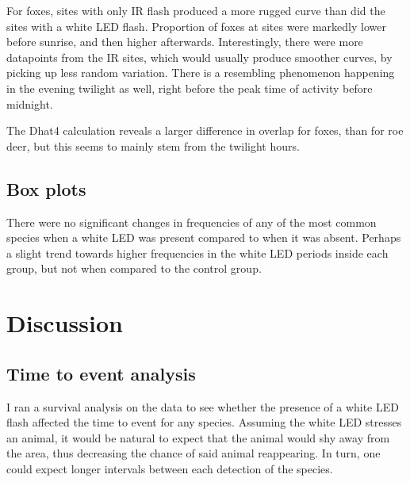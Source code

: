 For foxes, sites with only IR flash produced a more rugged curve than did the sites with a white LED flash.
Proportion of foxes at sites were markedly lower before sunrise, and then higher afterwards. 
Interestingly, there were more datapoints from the IR sites, which would usually produce smoother curves, by picking up less random variation. 
There is a resembling phenomenon happening in the evening twilight as well, right before the peak time of activity before midnight.

The Dhat4 calculation reveals a larger difference in overlap for foxes, than for roe deer, but this seems to mainly stem from the twilight hours.


\section{Box plots}


There were no significant changes in frequencies of any of the most common species when a white LED was present compared to when it was absent. Perhaps a slight trend towards higher frequencies in the white LED periods inside each group, but not when compared to the control group.





\chapter{Discussion}

\section{Time to event analysis}

I ran a survival analysis on the data to see whether the presence of a white LED flash affected the time to event for any species.
Assuming the white LED stresses an animal, it would be natural to expect that the animal would shy away from the area, thus decreasing the chance of said animal reappearing.
In turn, one could expect longer intervals between each detection of the species.

